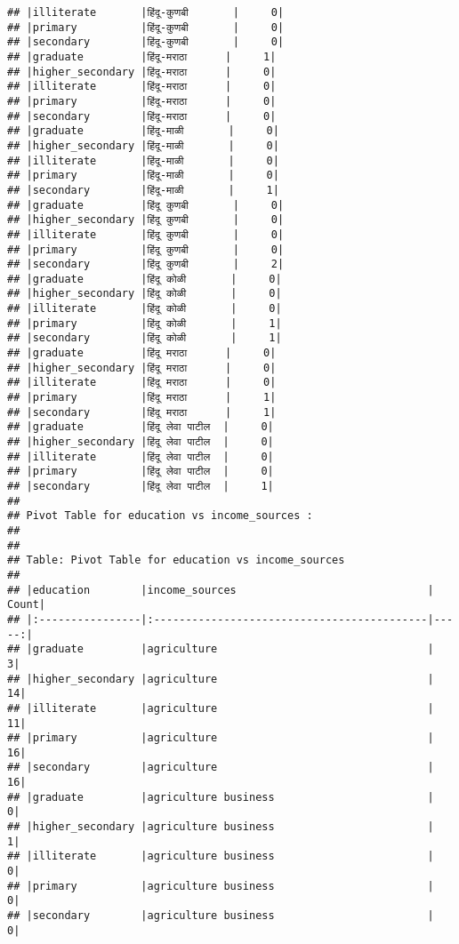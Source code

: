 \documentclass[
]{article}
\begin{document}
\begin{verbatim}
## |illiterate       |हिंदू-कुणबी       |     0|
## |primary          |हिंदू-कुणबी       |     0|
## |secondary        |हिंदू-कुणबी       |     0|
## |graduate         |हिंदू-मराठा      |     1|
## |higher_secondary |हिंदू-मराठा      |     0|
## |illiterate       |हिंदू-मराठा      |     0|
## |primary          |हिंदू-मराठा      |     0|
## |secondary        |हिंदू-मराठा      |     0|
## |graduate         |हिंदू-माळी       |     0|
## |higher_secondary |हिंदू-माळी       |     0|
## |illiterate       |हिंदू-माळी       |     0|
## |primary          |हिंदू-माळी       |     0|
## |secondary        |हिंदू-माळी       |     1|
## |graduate         |हिंदू कुणबी       |     0|
## |higher_secondary |हिंदू कुणबी       |     0|
## |illiterate       |हिंदू कुणबी       |     0|
## |primary          |हिंदू कुणबी       |     0|
## |secondary        |हिंदू कुणबी       |     2|
## |graduate         |हिंदू कोळी       |     0|
## |higher_secondary |हिंदू कोळी       |     0|
## |illiterate       |हिंदू कोळी       |     0|
## |primary          |हिंदू कोळी       |     1|
## |secondary        |हिंदू कोळी       |     1|
## |graduate         |हिंदू मराठा      |     0|
## |higher_secondary |हिंदू मराठा      |     0|
## |illiterate       |हिंदू मराठा      |     0|
## |primary          |हिंदू मराठा      |     1|
## |secondary        |हिंदू मराठा      |     1|
## |graduate         |हिंदू लेवा पाटील  |     0|
## |higher_secondary |हिंदू लेवा पाटील  |     0|
## |illiterate       |हिंदू लेवा पाटील  |     0|
## |primary          |हिंदू लेवा पाटील  |     0|
## |secondary        |हिंदू लेवा पाटील  |     1|
## 
## Pivot Table for education vs income_sources :
## 
## 
## Table: Pivot Table for education vs income_sources
## 
## |education        |income_sources                              | Count|
## |:----------------|:-------------------------------------------|-----:|
## |graduate         |agriculture                                 |     3|
## |higher_secondary |agriculture                                 |    14|
## |illiterate       |agriculture                                 |    11|
## |primary          |agriculture                                 |    16|
## |secondary        |agriculture                                 |    16|
## |graduate         |agriculture business                        |     0|
## |higher_secondary |agriculture business                        |     1|
## |illiterate       |agriculture business                        |     0|
## |primary          |agriculture business                        |     0|
## |secondary        |agriculture business                        |     0|

\end{verbatim}
\end{document}
